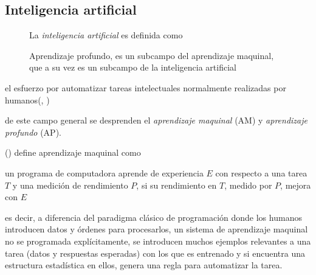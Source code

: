 \subsection {Inteligencia artificial}\label{subsec:intela}
\begin{wrapfigure}{R}{2.666cm}\begin{figure}[H]
\end{figure}\caption{Aprendizaje profundo, es un subcampo del aprendizaje maquinal, que a su vez es un subcampo de la inteligencia artificial}
La \emph{inteligencia artificial} es definida como\label{fig:AI}\end{wrapfigure}
\begin{displayquote}
el esfuerzo por automatizar tareas intelectuales normalmente realizadas por humanos(\citeauthor{cho18}, \citeyear{cho18})
\end{displayquote}
de este campo general se desprenden el \emph{aprendizaje maquinal} (AM) y \emph{aprendizaje profundo} (AP).

\citeauthor{mich19} (\citeyear{mich19}) define aprendizaje maquinal como\begin{displayquote}
un programa de computadora aprende de experiencia $E$ con respecto a una tarea $T$ y una medición de rendimiento $P$, si su rendimiento en $T$, medido por $P$, mejora con $E$
\end{displayquote}
es decir, a diferencia del paradigma clásico de programación donde los humanos introducen datos y órdenes para procesarlos, un sistema de aprendizaje maquinal no se programada explícitamente, se introducen muchos ejemplos relevantes a una tarea (datos y respuestas esperadas) con los que es entrenado y si encuentra una estructura estadística en ellos, genera una regla para automatizar la tarea.

